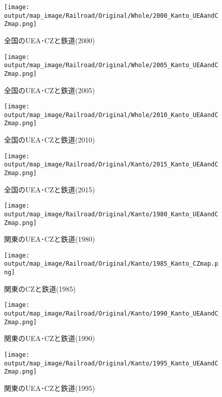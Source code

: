\documentclass{ltjsarticle}
\begin{document}
\begin{figure}[pbth]
  \centering
  \texttt{[image: output/map\_image/Railroad/Original/Whole/2000\_Kanto\_UEAandCZmap.png]}
  \caption{\label{2000:allCZandUEA:Rail}全国のUEA･CZと鉄道(2000)}
\end{figure}


\begin{figure}[pbth]
  \centering
  \texttt{[image: output/map\_image/Railroad/Original/Whole/2005\_Kanto\_UEAandCZmap.png]}
  \caption{\label{2005:allCZandUEA:Rail}全国のUEA･CZと鉄道(2005)}
\end{figure}


\begin{figure}[pbth]
  \centering
  \texttt{[image: output/map\_image/Railroad/Original/Whole/2010\_Kanto\_UEAandCZmap.png]}
  \caption{\label{2010:allCZandUEA:Rail}全国のUEA･CZと鉄道(2010)}
\end{figure}


\begin{figure}[pbth]
  \centering
  \texttt{[image: output/map\_image/Railroad/Original/Kanto/2015\_Kanto\_UEAandCZmap.png]}
  \caption{\label{2015:allCZandUEA:Rail}全国のUEA･CZと鉄道(2015)}
\end{figure}

\begin{figure}[pbth]
  \centering
  \texttt{[image: output/map\_image/Railroad/Original/Kanto/1980\_Kanto\_UEAandCZmap.png]}
  \caption{\label{1980:KanCZandUEA:Rail}関東のUEA･CZと鉄道(1980)}
\end{figure}


\begin{figure}[pbth]
  \centering
  \texttt{[image: output/map\_image/Railroad/Original/Kanto/1985\_Kanto\_CZmap.png]}
  \caption{\label{1985:KanCZandUEA:Rail}関東のCZと鉄道(1985)}
\end{figure}


\begin{figure}[pbth]
  \centering
  \texttt{[image: output/map\_image/Railroad/Original/Kanto/1990\_Kanto\_UEAandCZmap.png]}
  \caption{\label{1990:KanCZandUEA:Rail}関東のUEA･CZと鉄道(1990)}
\end{figure}


\begin{figure}[pbth]
  \centering
  \texttt{[image: output/map\_image/Railroad/Original/Kanto/1995\_Kanto\_UEAandCZmap.png]}
  \caption{\label{1995:KanCZandUEA:Rail}関東のUEA･CZと鉄道(1995)}
\end{figure}
\end{document}
